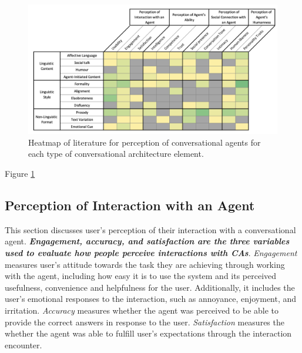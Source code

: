 \documentclass[sigconf,screen,review, anonymous]{acmart}
\begin{document}
\begin{figure}[h]
  \centering
  \includegraphics[width=\textwidth]{fig-heatmap-impact.png}
  \caption{Heatmap of literature for perception of conversational agents for each type of conversational architecture element.}
  \label{fig:heatmap-impact}
\end{figure}

Figure \ref{fig:heatmap-impact}


\subsection{Perception of Interaction with an Agent}

This section discusses user's perception of their interaction with a conversational agent. \textbf{\textit{Engagement, accuracy, and satisfaction are the three variables used to evaluate how people perceive interactions with CAs}}. \textit{Engagement} measures user's attitude towards the task they are achieving through working with the agent, including how easy it is to use the system and its perceived usefulness, convenience and helpfulness for the user. Additionally, it includes the user's emotional responses to the interaction, such as annoyance, enjoyment, and irritation. \textit{Accuracy} measures whether the agent was perceived to be able to provide the correct answers in response to the user. \textit{Satisfaction} measures the whether the agent was able to fulfill user's expectations through the interaction encounter.
\end{document}
